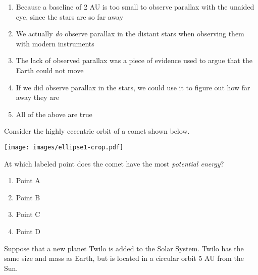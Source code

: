 \documentclass[12pt]{article}
\def\BS{\bigskip}
\newcommand{\BC}{\begin{center}}
\newcommand{\EC}{\end{center}}
\begin{document}
\begin{enumerate}
\begin{minipage}{\textwidth}
{\begin{enumerate}[label=(\Alph*)]
\setlength\itemsep{0.0em}
\item{ Because a baseline of 2 AU is too small to observe parallax with the unaided eye, since the stars are so far away }
\item{ We actually {\it do} observe parallax in the distant stars when observing them with modern instruments }
\item{ The lack of observed parallax was a piece of evidence used to argue that the Earth could not move }
\item{ If we did observe parallax in the stars, we could use it to figure out how far away they are }
\item{ All of the above are true }
\end{enumerate}
} %
\end{minipage}


\vspace{0.5in}

\begin{minipage}{\textwidth}
\item{Consider the highly eccentric orbit of a comet shown below.

\BS

\BC
\texttt{[image: images/ellipse1-crop.pdf]}
\EC

\BS

At which labeled point does the comet have the most {\it potential energy}? 

\begin{enumerate}[label=(\Alph*)]
\setlength\itemsep{0.0em}
\item{ Point A }
\item{ Point B }
\item{ Point C }
\item{ Point D }
\end{enumerate}
} %
\end{minipage}


\vspace{0.5in}

\begin{minipage}{\textwidth}
\item{Suppose that a new planet Twilo is added to the Solar System. Twilo has the same size and mass as Earth, but is located in a circular
orbit 5 AU from the Sun.

}
\end{minipage}
\end{enumerate}
\end{document}
